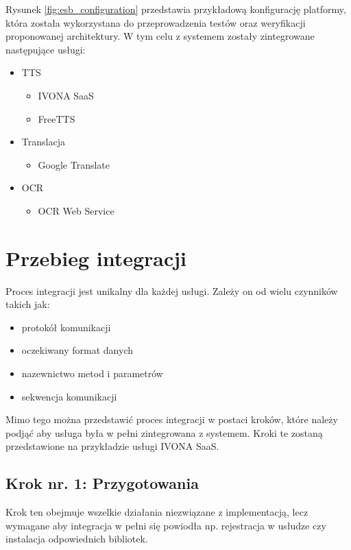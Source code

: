 Rysunek \ref{fig:esb_configuration} przedstawia przykładową konfigurację platformy, która została wykorzystana do przeprowadzenia testów oraz weryfikacji proponowanej architektury. W tym celu z systemem zostały zintegrowane następujące usługi:

\begin{itemize}
	\item TTS
	\begin{itemize}
		\item IVONA SaaS
		\item FreeTTS
	\end{itemize}
	\item Translacja
	\begin{itemize}
		\item Google Translate
	\end{itemize}
	\item OCR
	\begin{itemize}
		\item OCR Web Service
	\end{itemize}
\end{itemize}

\section {Przebieg integracji}

Proces integracji jest unikalny dla każdej usługi. Zależy on od wielu czynników takich jak:

\begin{itemize}
	\item protokół komunikacji
	\item oczekiwany format danych
	\item nazewnictwo metod i parametrów
	\item sekwencja komunikacji
\end{itemize}

Mimo tego można przedstawić proces integracji w postaci kroków, które należy podjąć aby usługa była w pełni zintegrowana z systemem. Kroki te zostaną przedstawione na przykładzie usługi IVONA SaaS.

\subsection {Krok nr. 1: Przygotowania}
Krok ten obejmuje wszelkie działania niezwiązane z implementacją, lecz wymagane aby integracja w pełni się powiodła np. rejestracja w usłudze czy instalacja odpowiednich bibliotek.

